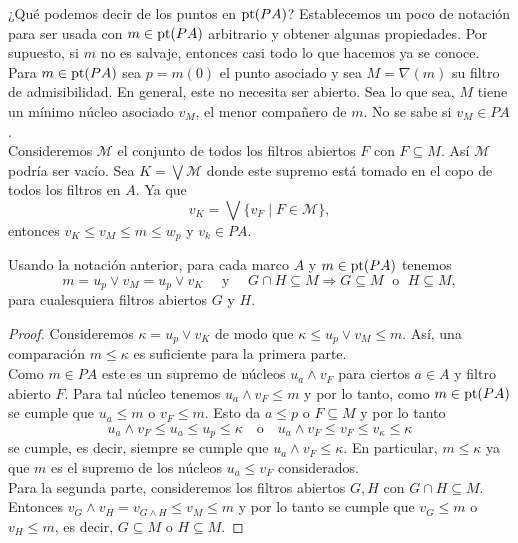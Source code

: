 ¿Qué podemos decir de los puntos en $\mathrm{pt}(PA)$? Establecemos un poco de notación para ser usada con $m\in \mathrm{pt}(PA)$ arbitrario y obtener algunas propiedades. Por supuesto, si $m$ no es salvaje, entonces casi todo lo que hacemos ya se conoce.\\

Para $m\in\mathrm{pt}(PA)$ sea $p=m(0)$ el punto asociado y sea $M=\nabla(m)$ su filtro de admisibilidad. En general, este no necesita ser abierto. Sea lo que sea, $M$ tiene un mínimo núcleo asociado $v_M$, el menor compañero de $m$. No se sabe si $v_M\in PA$.\\

Consideremos $\mathcal{M}$ el conjunto de todos los filtros abiertos $F$ con $F\subseteq M$. Así $\mathcal{M}$ podría ser vacío. Sea $K=\bigvee \mathcal{M}$ donde este supremo está tomado en el copo de todos los filtros en $A$. Ya que
\[
v_K=\bigvee\{v_F\mid F\in \mathcal{M}\},
\]
entonces $v_K\leq v_M\leq m\leq w_p$ y $v_k\in PA$.

\begin{lem}
    Usando la notación anterior, para cada marco $A$ y $m\in \mathrm{pt}(PA)$ tenemos 
    \[
    m=u_p\vee v_M=u_p\vee v_K\quad\mbox{ y }\quad G\cap H\subseteq M\Rightarrow G\subseteq M\; \mbox{ o }\; H\subseteq M,
    \]
    para cualesquiera filtros abiertos $G$ y $H$.
\end{lem}

\begin{proof}
    Consideremos $\kappa=u_p\vee v_K$ de modo que $\kappa\leq u_p\vee v_M\leq m$. Así, una comparación $m\leq \kappa$ es suficiente para la primera parte.\\

    Como $m\in PA$ este es un supremo de núcleos $u_a\wedge v_F$ para ciertos $a\in A$ y filtro abierto $F$. Para tal núcleo tenemos $u_a\wedge v_F\leq m$ y por lo tanto, como $m\in \mathrm{pt}(PA)$ se cumple que $u_a\leq m$ o $v_F\leq m$. Esto da $a\leq p$ o $F\subseteq M$ y por lo tanto 
    \[
    u_a\wedge v_F\leq u_a\leq u_p\leq \kappa \quad \mbox{o}\quad u_a\wedge v_F\leq v_F\leq v_\kappa\leq \kappa
    \]
    se cumple, es decir, siempre se cumple que $u_a\wedge v_F\leq \kappa$. En particular, $m\leq \kappa$ ya que $m$ es el supremo de los núcleos $u_a\leq v_F$ considerados.\\

    Para la segunda parte, consideremos los filtros abiertos $G, H$ con $G\cap H\subseteq M$. Entonces $v_G\wedge v_H=v_{G\wedge H}\leq v_M\leq m$ y por lo tanto se cumple que $v_G\leq m$ o $v_H\leq m$, es decir, $G\subseteq M$ o $H\subseteq M$.
\end{proof}

